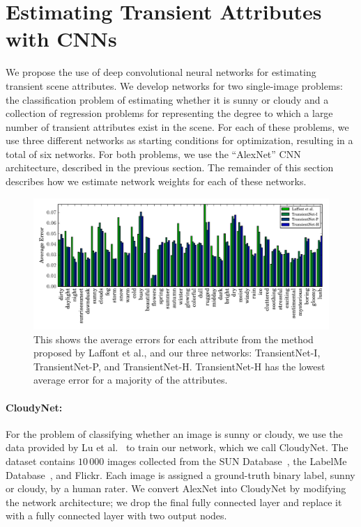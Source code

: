 \documentclass[10pt,twocolumn,letterpaper]{article}
\begin{document}
\section{Estimating Transient Attributes with CNNs}
\label{sec:method}

We propose the use of deep convolutional neural networks for estimating transient
scene attributes. We develop networks for two single-image problems: the
classification problem of estimating whether it is sunny or cloudy and a
collection of regression problems for representing the degree to which a large
number of transient attributes exist in the scene.  For each of these problems,
we use three different networks as starting conditions for optimization,
resulting in a total of six networks.  For both problems, we use the
``AlexNet'' CNN architecture, described in the previous section.  The remainder
of this section describes how we estimate network weights for each of these
networks.

\begin{figure}[t!]
	\centering
		\includegraphics[width=1.0\textwidth, trim= 0 4mm 0 0]{figs/avg_err_compare.pdf}
		\caption{This shows the average errors for each attribute from the method proposed
						 by Laffont et al., and our three networks: TransientNet-I, TransientNet-P,
             and TransientNet-H.  TransientNet-H has the lowest average error for a 
             majority of the attributes.}
		\label{fig:compare}
\end{figure}

\paragraph{CloudyNet:} For the problem of classifying whether an image is sunny or
cloudy, we use the data provided by Lu et al.~\cite{lutwoclass} to train our
network, which we call CloudyNet. 
The dataset contains $10\,000$ images collected from the SUN
Database~\cite{xiaoSUN}, the LabelMe Database~\cite{russell2008labelme}, and
Flickr. Each image is assigned a ground-truth binary label,
sunny or cloudy, by a human rater.
We convert AlexNet into CloudyNet by modifying the network
architecture; we 
drop the final fully connected layer and replace it with a
fully connected layer with two output nodes.
\end{document}

